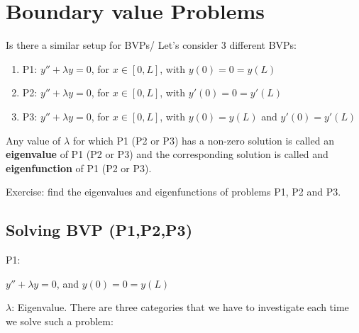 \graphicspath{{./Lecture7/}}

\section{Boundary value Problems}

Is there a similar setup for BVPs/ Let's consider 3 different BVPs:
\begin{enumerate}
    \item P1: $y'' + \lambda y = 0$, for $x \in [0,L]$, with $y(0) = 0 = y(L)$
    \item P2: $y'' + \lambda y = 0$, for $x \in [0,L]$, with $y'(0) = 0 = y'(L)$
    \item P3: $y'' + \lambda y = 0$, for $x \in [0,L]$, with $y(0) = y(L)$ and $y'(0) = y'(L)$
\end{enumerate}

Any value of $\lambda$ for which P1 (P2 or P3) has a non-zero solution is called an \textbf{eigenvalue} of P1 (P2 or P3) and the corresponding solution is called and \textbf{eigenfunction} of P1 (P2 or P3).

Exercise: find the eigenvalues and eigenfunctions of problems P1, P2 and P3. 

\subsection{Solving BVP (P1,P2,P3)}

P1: \begin{center} $y'' + \lambda y = 0$, and $y(0) = 0 = y(L)$ \end{center}

$\lambda$: Eigenvalue. There are three categories that we have to investigate each time we solve such a problem:

